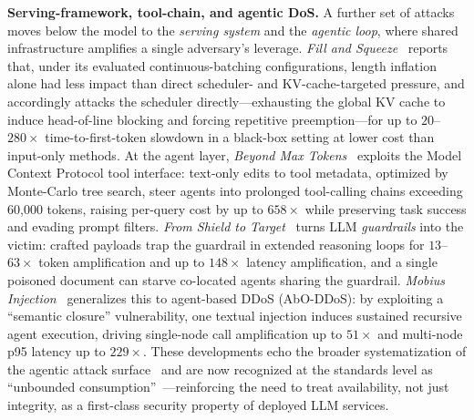 \documentclass[acmsmall,screen,review,nonacm]{acmart}
\begin{document}
\noindent\textbf{Serving-framework, tool-chain, and agentic DoS.}
A further set of attacks moves below the model to the \emph{serving system} and the \emph{agentic loop}, where shared infrastructure amplifies a single adversary's leverage. \emph{Fill and Squeeze}~\cite{wang2026fillsqueeze} reports that, under its evaluated continuous-batching configurations, length inflation alone had less impact than direct scheduler- and KV-cache-targeted pressure, and accordingly attacks the scheduler directly---exhausting the global KV cache to induce head-of-line blocking and forcing repetitive preemption---for up to $20$--$280\times$ time-to-first-token slowdown in a black-box setting at lower cost than input-only methods. At the agent layer, \emph{Beyond Max Tokens}~\cite{zhou2026beyondmaxtokens} exploits the Model Context Protocol tool interface: text-only edits to tool metadata, optimized by Monte-Carlo tree search, steer agents into prolonged tool-calling chains exceeding 60{,}000 tokens, raising per-query cost by up to $658\times$ while preserving task success and evading prompt filters. \emph{From Shield to Target}~\cite{zhou2026shieldtarget} turns LLM \emph{guardrails} into the victim: crafted payloads trap the guardrail in extended reasoning loops for $13$--$63\times$ token amplification and up to $148\times$ latency amplification, and a single poisoned document can starve co-located agents sharing the guardrail. \emph{Mobius Injection}~\cite{liang2026mobius} generalizes this to agent-based DDoS (AbO-DDoS): by exploiting a ``semantic closure'' vulnerability, one textual injection induces sustained recursive agent execution, driving single-node call amplification up to $51\times$ and multi-node p95 latency up to $229\times$. These developments echo the broader systematization of the agentic attack surface~\cite{dehghantanha2026sokagentic} and are now recognized at the standards level as ``unbounded consumption''~\cite{owasp2025unbounded}---reinforcing the need to treat availability, not just integrity, as a first-class security property of deployed LLM services.
\end{document}
